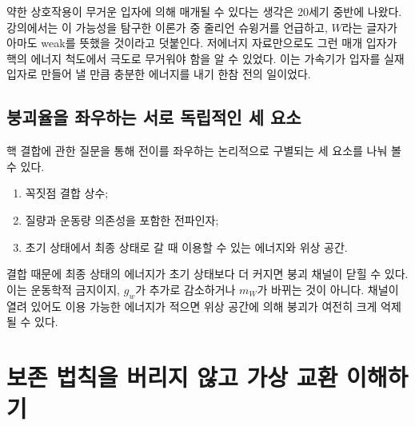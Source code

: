 약한 상호작용이 무거운 입자에 의해 매개될 수 있다는 생각은 20세기 중반에 나왔다. 강의에서는 이 가능성을 탐구한 이론가 중 줄리언 슈윙거를 언급하고, \(W\)라는 글자가 아마도 weak를 뜻했을 것이라고 덧붙인다. 저에너지 자료만으로도 그런 매개 입자가 핵의 에너지 척도에서 극도로 무거워야 함을 알 수 있었다. 이는 가속기가 입자를 실재 입자로 만들어 낼 만큼 충분한 에너지를 내기 한참 전의 일이었다.

\subsection{붕괴율을 좌우하는 서로 독립적인 세 요소}

핵 결합에 관한 질문을 통해 전이를 좌우하는 논리적으로 구별되는 세 요소를 나눠 볼 수 있다.
\begin{enumerate}
  \item 꼭짓점 결합 상수;
  \item 질량과 운동량 의존성을 포함한 전파인자;
  \item 초기 상태에서 최종 상태로 갈 때 이용할 수 있는 에너지와 위상 공간.
\end{enumerate}
결합 때문에 최종 상태의 에너지가 초기 상태보다 더 커지면 붕괴 채널이 닫힐 수 있다. 이는 운동학적 금지이지, \(g_w\)가 추가로 감소하거나 \(m_W\)가 바뀌는 것이 아니다. 채널이 열려 있어도 이용 가능한 에너지가 적으면 위상 공간에 의해 붕괴가 여전히 크게 억제될 수 있다.

\begin{classroomqa}\end{classroomqa}

\begin{classroomqa}\end{classroomqa}

\section{보존 법칙을 버리지 않고 가상 교환 이해하기}

